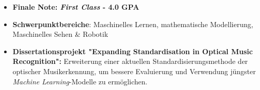 \documentclass[10pt,a4paper,ragged2e,withhyper]{altacv}
\begin{document}
\begin{paracol}{2}



\begin{itemize}
    \item \textbf{Finale Note: \emph{First Class} - 4.0 GPA}
    \item \textbf{Schwerpunktbereiche}: Maschinelles Lernen, mathematische Modellierung, Maschinelles Sehen \& Robotik
    \item \textbf{Dissertationsprojekt "Expanding Standardisation in Optical Music Recognition":} Erweiterung einer aktuellen Standardisierungsmethode der optischer Musikerkennung, um bessere Evaluierung und Verwendung jüngster \emph{Machine Learning}-Modelle zu ermöglichen.
\end{itemize}

\newpage









\switchcolumn


\end{paracol}
\end{document}
